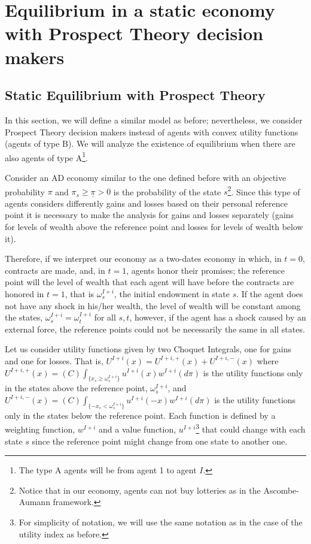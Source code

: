 \documentclass[pdftex]{article}
\numberwithin{equation}{section}
\theoremstyle{th}
\newtheorem{proof lemma}{{Proof Lemma}.}
\theoremstyle{definition}
\begin{document}
{\section{Equilibrium in a static economy with Prospect Theory decision makers}
\label{sectionfs}


\subsection{Static Equilibrium with Prospect Theory}

In this section, we will define a similar model as before; nevertheless, we consider Prospect Theory decision makers instead of agents with convex utility functions (agents of type B). We will analyze the existence of equilibrium when there are also agents of type A\footnote{The type A agents will be from agent 1 to agent $I$.}.



Consider an AD economy similar to the one defined before with an objective probability $\pi$ and $\pi_s\geq\underline{\pi}>0$ is the probability of the state $s$\footnote{Notice that in our economy, agents can not buy lotteries as in the Ascombe-Aumann framework.}. Since this type of agents considers differently gains and losses based on their personal reference point it is necessary to make the analysis for gains and losses separately (gains for levels of wealth above the reference point and losses for levels of wealth below it).

{Therefore, if we interpret our economy as a two-dates economy in which, in $t=0$, contracts are made, and, in $t=1$, agents honor their promises; the reference point will the level of wealth that each agent will have before the contracts are honored in $t=1$, that is $\omega^{I+i}_s$, the initial endowment in state $s$.}
{If the agent does not have any shock in his/her wealth, the level of wealth will be constant among the states, $\omega^{I+i}_{s}=\omega^{I+i}_t$ for all $s,t$, however, if the agent has a shock caused by an external force, the reference points could not be necessarily the same in all states.}


Let us consider utility functions given by two Choquet Integrals, one for gains and one for losses. That is, $U^{I+i}(x)=U^{I+i,+}(x)+U^{I+i,-}(x)$ where $U^{I+i,+}(x)=(C)\int_{\{x_s\geq\omega^{I+i}_s\}}u^{I+i}(x)w^{I+i}(d\pi)$ is the utility functions only in the states above the reference point, $\omega^{I+i}_s$, and $U^{I+i,-}(x)=(C)\int_{\{-x_s<\omega^{I+i}_s\}}u^{I+i}(-x)w^{I+i}(d\pi)$ is the utility functions only in the states below the reference point. Each function is defined by a weighting function, $w^{I+i}$ and a value function, $u^{I+i}$\footnote{For simplicity of notation, we will use the same notation as in the case of the utility index as before.} that could change with each state $s$ since the reference point might change from one state to another one.

}
\end{document}
